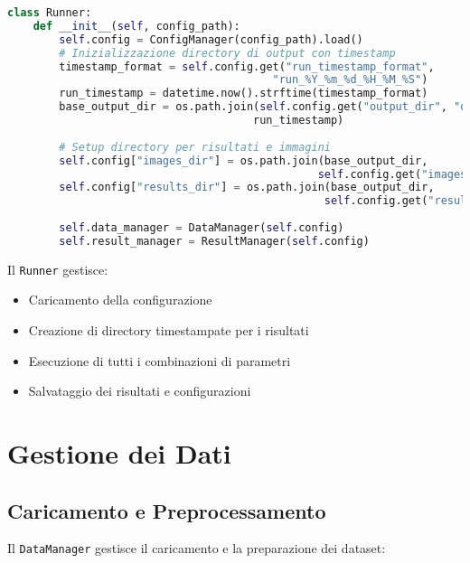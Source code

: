 \begin{lstlisting}[language=Python, caption=Classe Runner - Gestione del flusso sperimentale]
class Runner:
    def __init__(self, config_path):
        self.config = ConfigManager(config_path).load()
        # Inizializzazione directory di output con timestamp
        timestamp_format = self.config.get("run_timestamp_format", 
                                         "run_%Y_%m_%d_%H_%M_%S")
        run_timestamp = datetime.now().strftime(timestamp_format)
        base_output_dir = os.path.join(self.config.get("output_dir", "output"), 
                                      run_timestamp)
        
        # Setup directory per risultati e immagini
        self.config["images_dir"] = os.path.join(base_output_dir, 
                                                self.config.get("images_subdir", "images"))
        self.config["results_dir"] = os.path.join(base_output_dir, 
                                                 self.config.get("results_subdir", "results"))
        
        self.data_manager = DataManager(self.config)
        self.result_manager = ResultManager(self.config)
\end{lstlisting}

Il \texttt{Runner} gestisce:
\begin{itemize}
    \item Caricamento della configurazione
    \item Creazione di directory timestampate per i risultati
    \item Esecuzione di tutti i combinazioni di parametri
    \item Salvataggio dei risultati e configurazioni
\end{itemize}

\section{Gestione dei Dati}

\subsection{Caricamento e Preprocessamento}

Il \texttt{DataManager} gestisce il caricamento e la preparazione dei dataset:

